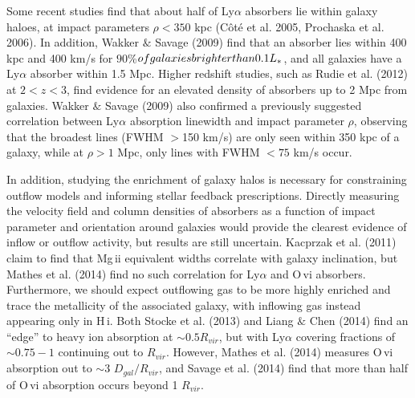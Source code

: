 \documentclass[iop]{emulateapj-rtx4}
\begin{document}


Some recent studies find that about half of Ly$\alpha$ absorbers lie within galaxy haloes, at impact parameters $\rho<350$ kpc (C\^{o}t\'{e} et al. 2005, Prochaska et al. 2006). In addition, Wakker $\&$ Savage (2009) find that an absorber lies within 400 kpc and 400 km/s for $90$\%$ of galaxies brighter than 0.1L_{\**}$, and all galaxies have a Ly$\alpha$ absorber within 1.5 Mpc. Higher redshift studies, such as Rudie et al. (2012) at $2<z<3$, find evidence for an elevated density of absorbers up to 2 Mpc from galaxies. Wakker $\&$ Savage (2009) also confirmed a previously suggested correlation between Ly$\alpha$ absorption linewidth and impact parameter $\rho$, observing that the broadest lines (FWHM $>$150 km/s) are only seen within 350 kpc of a galaxy, while at $\rho>1$ Mpc, only lines with FWHM $<75$ km/s occur.


In addition, studying the enrichment of galaxy halos is necessary for constraining outflow models and informing stellar feedback prescriptions. Directly measuring the velocity field and column densities of absorbers as a function of impact parameter and orientation around galaxies would provide the clearest evidence of inflow or outflow activity, but results are still uncertain. Kacprzak et al. (2011) claim to find that Mg\,{\sc ii} equivalent widths correlate with galaxy inclination, but Mathes et al. (2014) find no such correlation for Ly$\alpha$ and O\,{\sc vi} absorbers. Furthermore, we should expect outflowing gas to be more highly enriched and trace the metallicity of the associated galaxy, with inflowing gas instead appearing only in H\,{\sc i}. Both Stocke et al. (2013) and Liang $\&$ Chen (2014) find an ``edge'' to heavy ion absorption at $\sim0.5R_{vir}$, but with Ly$\alpha$ covering fractions of $\sim0.75-1$ continuing out to $R_{vir}$. However, Mathes et al. (2014) measures O\,{\sc vi} absorption out to $\sim3$ $D_{gal}/R_{vir}$, and Savage et al. (2014) find that more than half of O\,{\sc vi} absorption occurs beyond 1 $R_{vir}$.
\end{document}
